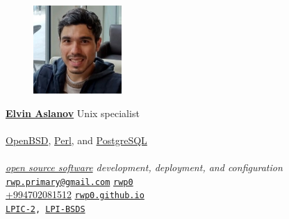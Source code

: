 \documentclass[10pt, oneside, final]{article}
\begin{document}
  \thispagestyle{empty}
  \begin{figure}
  \includegraphics[width = 0.3\textwidth]{business_card.jpg}
  \end{figure}
  \underline{\large\textsf{\textbf{Elvin Aslanov}}}
  {Unix specialist} \\
  \\
  {\href{https://openbsd.org/}{OpenBSD}, \href{https://perl.org/}{Perl}, and \href{https://postgresql.org/}{PostgreSQL}} \\
  \\
  \emph{\href{https://en.wikipedia.org/wiki/Open-source_software}{open source software} development, deployment, and configuration}
  \vfill 
  {\faEnvelope} \texttt{\href{mailto:rwp.primary@gmail.com}{rwp.primary@gmail.com}} \hfill 
  {\faGithub} \texttt{\href{https://github.com/rwp0}{rwp0}} \\
  {\faPhone} \href{tel:+994702081512}{+994{\textendash}70{\textendash}208{\textendash}15{\textendash}12}
 \hfill
  {\faGlobe} \texttt{\href{https://rwp0.github.io/}{rwp0.github.io}} \\
  {\faCertificate} \texttt{\href{https://cs.lpi.org/caf/Xamman/certification/verify/LPI000307519/bafrejwgeb}{LPIC-2}, \href{https://cs.lpi.org/caf/Xamman/certification/verify/LPI000307519/mvuk2szhhw}{LPI-BSDS}}
\end{document}
